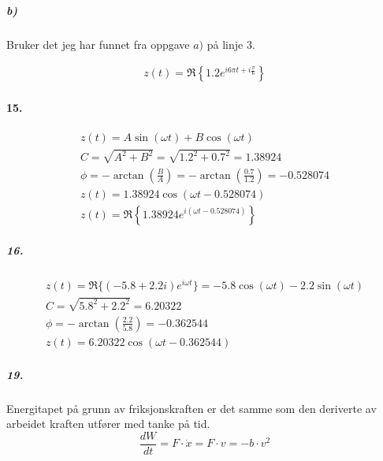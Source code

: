 \documentclass[11pt, A4paper,norsk]{article}
\begin{document}
			\subparagraph{b)}
				\begin{flushleft}
Bruker det jeg har funnet fra oppgave $a)$ på linje $3$.
				\end{flushleft}
				\begin{gather}
z(t) = \Re\left\{ 1.2 e^{i 6\pi t + i \frac{\pi}{6}} \right\}
				\end{gather}









		\paragraph{15.}
			\begin{gather*}
z(t) = A\sin(\omega t) + B\cos(\omega t) \\
C = \sqrt{A^2 + B^2} = \sqrt{1.2^2 + 0.7^2} = 1.38924 \\
\phi = -\arctan\left(\frac{B}{A}\right) = -\arctan\left(\frac{0.7}{1.2}\right) = -0.528074\\
z(t) =  1.38924 \cos(\omega t - 0.528074) \\
z(t) = \Re\left\{ 1.38924 e^{i (\omega t - 0.528074)} \right\}
			\end{gather*}








			\subparagraph{16.}
				\begin{gather*}
z(t) = \Re\{ (-5.8 + 2.2i)e^{i\omega t} \} = -5.8 \cos(\omega t) - 2.2 \sin(\omega t) \\
C = \sqrt{5.8^2 + 2.2^2} = 6.20322 \\
\phi = -\arctan\left( \frac{2.2}{5.8} \right) = - 0.362544 \\
z(t) = 6.20322 \cos(\omega t - 0.362544)
				\end{gather*}









			\subparagraph{19.}
				\begin{flushleft}
Energitapet på grunn av friksjonskraften er det samme som den deriverte av arbeidet kraften utfører med tanke på tid. $$\frac{dW}{dt} = F \cdot \dot{x} = F \cdot v = -b \cdot v^2$$ 
				\end{flushleft}
\end{document}
